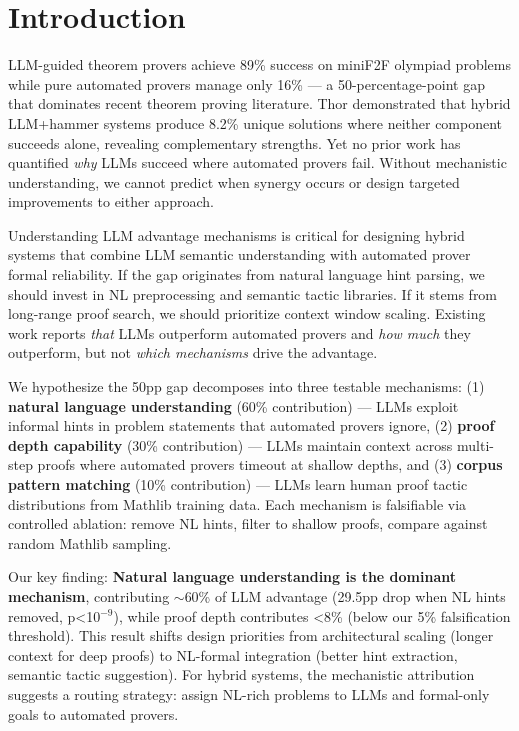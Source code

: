 \section{Introduction}

LLM-guided theorem provers achieve 89\% success on miniF2F olympiad problems \cite{DeepSeekProverV2_2025} while pure automated provers manage only 16\% --- a 50-percentage-point gap that dominates recent theorem proving literature. Thor \cite{Thor_2022} demonstrated that hybrid LLM+hammer systems produce 8.2\% unique solutions where neither component succeeds alone, revealing complementary strengths. Yet no prior work has quantified \emph{why} LLMs succeed where automated provers fail. Without mechanistic understanding, we cannot predict when synergy occurs or design targeted improvements to either approach.

Understanding LLM advantage mechanisms is critical for designing hybrid systems that combine LLM semantic understanding with automated prover formal reliability. If the gap originates from natural language hint parsing, we should invest in NL preprocessing and semantic tactic libraries. If it stems from long-range proof search, we should prioritize context window scaling. Existing work reports \emph{that} LLMs outperform automated provers and \emph{how much} they outperform, but not \emph{which mechanisms} drive the advantage.

We hypothesize the 50pp gap decomposes into three testable mechanisms: (1) \textbf{natural language understanding} (60\% contribution) --- LLMs exploit informal hints in problem statements that automated provers ignore, (2) \textbf{proof depth capability} (30\% contribution) --- LLMs maintain context across multi-step proofs where automated provers timeout at shallow depths, and (3) \textbf{corpus pattern matching} (10\% contribution) --- LLMs learn human proof tactic distributions from Mathlib training data. Each mechanism is falsifiable via controlled ablation: remove NL hints, filter to shallow proofs, compare against random Mathlib sampling.

Our key finding: \textbf{Natural language understanding is the dominant mechanism}, contributing $\sim$60\% of LLM advantage (29.5pp drop when NL hints removed, p<10$^{-9}$), while proof depth contributes <8\% (below our 5\% falsification threshold). This result shifts design priorities from architectural scaling (longer context for deep proofs) to NL-formal integration (better hint extraction, semantic tactic suggestion). For hybrid systems, the mechanistic attribution suggests a routing strategy: assign NL-rich problems to LLMs and formal-only goals to automated provers.


